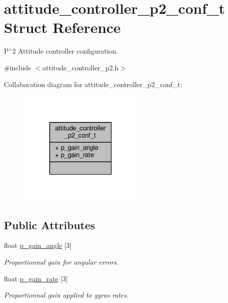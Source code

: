 \hypertarget{structattitude__controller__p2__conf__t}{\section{attitude\+\_\+controller\+\_\+p2\+\_\+conf\+\_\+t Struct Reference}
\label{structattitude__controller__p2__conf__t}
}


P$^\wedge$2 Attitude controller configuration.  




{\ttfamily \#include $<$attitude\+\_\+controller\+\_\+p2.\+h$>$}



Collaboration diagram for attitude\+\_\+controller\+\_\+p2\+\_\+conf\+\_\+t\+:
\nopagebreak
\begin{figure}[H]
\begin{center}
\leavevmode
\includegraphics[width=174pt]{structattitude__controller__p2__conf__t__coll__graph}
\end{center}
\end{figure}
\subsection*{Public Attributes}
\begin{DoxyCompactItemize}
\item 
\hypertarget{structattitude__controller__p2__conf__t_a5fa14f7e63ac2bbb382c30d3f534e58a}{float \hyperlink{structattitude__controller__p2__conf__t_a5fa14f7e63ac2bbb382c30d3f534e58a}{p\+\_\+gain\+\_\+angle} \mbox{[}3\mbox{]}}\label{structattitude__controller__p2__conf__t_a5fa14f7e63ac2bbb382c30d3f534e58a}

\begin{DoxyCompactList}\small\item\em Proportionnal gain for angular errors. \end{DoxyCompactList}\item 
\hypertarget{structattitude__controller__p2__conf__t_a29e63d02f3de08fe2a2368d165f9f1b3}{float \hyperlink{structattitude__controller__p2__conf__t_a29e63d02f3de08fe2a2368d165f9f1b3}{p\+\_\+gain\+\_\+rate} \mbox{[}3\mbox{]}}\label{structattitude__controller__p2__conf__t_a29e63d02f3de08fe2a2368d165f9f1b3}

\begin{DoxyCompactList}\small\item\em Proportionnal gain applied to gyros rates. \end{DoxyCompactList}\end{DoxyCompactItemize}


